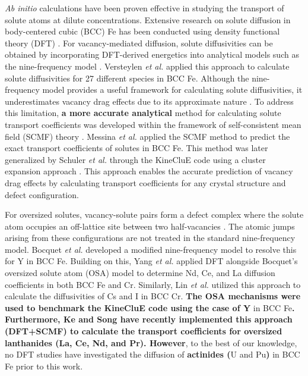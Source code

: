 \documentclass[preprint,12pt]{elsarticle}
\providecommand{\DIFaddtex}[1]{{\bf #1}} %
\providecommand{\DIFdeltex}[1]{} %
\providecommand{\DIFaddbegin}{\protect\color{blue}} %
\providecommand{\DIFaddend}{\protect\color{black}} %
\providecommand{\DIFdelbegin}{\protect\color{red}} %
\providecommand{\DIFdelend}{\protect\color{black}} %
\providecommand{\DIFadd}[1]{\texorpdfstring{\DIFaddtex{#1}}{#1}} %
\providecommand{\DIFdel}[1]{\texorpdfstring{\DIFdeltex{#1}}{}} %
\newcommand{\DIFscaledelfig}{0.5}
\newlength{\DIFdelgraphicswidth} %
\newlength{\DIFdelgraphicsheight} %
\newcommand{\DIFaddincludegraphics}[2][]{{\color{blue}\fbox{\DIFOincludegraphics[#1]{#2}}}} %
\newcommand{\DIFdelincludegraphics}[2][]{%
\sbox{\DIFdelgraphicsbox}{\DIFOincludegraphics[#1]{#2}}%
\settoboxwidth{\DIFdelgraphicswidth}{\DIFdelgraphicsbox} %
\settoboxtotalheight{\DIFdelgraphicsheight}{\DIFdelgraphicsbox} %
\scalebox{\DIFscaledelfig}{%
\parbox[b]{\DIFdelgraphicswidth}{\usebox{\DIFdelgraphicsbox}\\[-\baselineskip] \rule{\DIFdelgraphicswidth}{0em}}\llap{\resizebox{\DIFdelgraphicswidth}{\DIFdelgraphicsheight}{%
\setlength{\unitlength}{\DIFdelgraphicswidth}%
\begin{picture}(1,1)%
\thicklines\linethickness{2pt} %
{\color[rgb]{1,0,0}\put(0,0){\framebox(1,1){}}}%
{\color[rgb]{1,0,0}\put(0,0){\line( 1,1){1}}}%
{\color[rgb]{1,0,0}\put(0,1){\line(1,-1){1}}}%
\end{picture}%
}\hspace*{3pt}}} %
} %
\DeclareRobustCommand{\DIFaddbegin}{\DIFOaddbegin \let\includegraphics\DIFaddincludegraphics} %
\DeclareRobustCommand{\DIFaddend}{\DIFOaddend \let\includegraphics\DIFOincludegraphics} %
\DeclareRobustCommand{\DIFdelbegin}{\DIFOdelbegin \let\includegraphics\DIFdelincludegraphics} %
\DeclareRobustCommand{\DIFdelend}{\DIFOaddend \let\includegraphics\DIFOincludegraphics} %
\begin{document}
\textit{Ab initio} calculations have been proven effective in studying the transport of solute atoms at dilute concentrations. Extensive research on solute diffusion in body-centered cubic (BCC) Fe has been conducted using density functional theory (DFT) \cite{messina_exact_2014, murali_bcc_fe_2015, versteylen_first-principles_2017}. For vacancy-mediated diffusion, solute diffusivities can be obtained by incorporating DFT-derived energetics into analytical models such as the nine-frequency model \cite{leclaire1970}. Versteylen \textit{et al.} \cite{versteylen_first-principles_2017} applied this approach to calculate solute diffusivities for 27 different species in BCC Fe. Although the nine-frequency model provides a useful framework for calculating solute diffusivities, it underestimates vacancy drag effects due to its approximate nature \cite{messina_exact_2014}. To address this limitation, \DIFdelbegin \DIFdel{an exact }\DIFdelend \DIFaddbegin \DIFadd{a more accurate analytical }\DIFaddend method for calculating solute transport coefficients was developed within the framework of self-consistent mean field (SCMF) theory \cite{nastar_self-consistent_2000, nastar_mean_2005}. Messina \textit{et al.} \cite{messina_exact_2014} applied the SCMF method to predict the exact transport coefficients of solutes in BCC Fe. This method was later generalized by Schuler  \textit{et al.} through the KineCluE code \cite{schuler_kineclue_2020} using a cluster expansion approach \cite{schuler_transport_2016}. This approach enables the accurate prediction of vacancy drag effects by calculating \DIFdelbegin \DIFdel{exact }\DIFdelend transport coefficients for any crystal structure and defect configuration.

For oversized solutes, vacancy-solute pairs form a defect complex where the solute atom occupies an off-lattice site between two half-vacancies \cite{bocquet_migration_2017}. The atomic jumps 
arising from these configurations are not treated in the standard nine-frequency model.
Bocquet \textit{et al.} \cite{bocquet_migration_2017} developed a modified nine-frequency model \cite{leclaire1970} to resolve this for Y in BCC Fe. Building on this, Yang \textit{et al.} \cite{yang_significant_2023} applied DFT alongside Bocquet’s oversized solute atom (OSA) model to determine Nd, Ce, and La diffusion coefficients in both BCC Fe and Cr. Similarly, Lin \textit{et al.} \cite{lin2024first} utilized this approach to calculate the diffusivities of Cs and I in BCC Cr. \DIFdelbegin \DIFdel{However, the transport coefficients for oversized solutes }\DIFdelend \DIFaddbegin \DIFadd{The OSA mechanisms were used to benchmark the KineCluE code \cite{schuler_kineclue_2020} using the case of Y }\DIFaddend in BCC Fe\DIFdelbegin \DIFdel{have not been accurately calculated using the SCMFmethod. Furthermore}\DIFdelend \DIFaddbegin \DIFadd{. Furthermore, Ke and Song \cite{ke2025diffusion} have recently implemented this approach (DFT+SCMF) to calculate the transport coefficients for oversized lanthanides (La, Ce, Nd, and Pr). However}\DIFaddend , to the best of our knowledge, no DFT studies have investigated the diffusion of \DIFaddbegin \DIFadd{actinides (}\DIFaddend U and Pu\DIFaddbegin \DIFadd{) }\DIFaddend in BCC Fe prior to this work.
\end{document}
